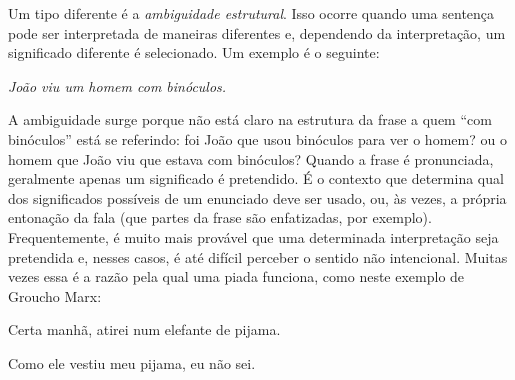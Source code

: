 Um tipo diferente é a \emph{ambiguidade estrutural}. Isso ocorre quando uma sentença pode ser interpretada de maneiras diferentes e, dependendo da interpretação, um significado diferente é selecionado. Um exemplo é o seguinte:
\begin{earg}
\item[] \textit{João viu um homem com binóculos.}
\end {earg}
A ambiguidade surge porque não está claro na estrutura da frase a quem ``com binóculos'' está se referindo: foi João que usou binóculos para ver o homem? ou o homem que João viu que estava com binóculos?
Quando a frase é pronunciada, geralmente apenas um significado é pretendido. É o contexto que determina qual dos significados possíveis de um enunciado deve ser usado, ou, às vezes, a própria entonação da fala (que partes da frase são enfatizadas, por exemplo). Frequentemente, é muito mais provável que uma determinada interpretação seja pretendida e, nesses casos, é até difícil perceber o sentido não intencional. Muitas vezes essa é a razão pela qual uma piada funciona, como neste exemplo de Groucho Marx:
\begin{earg}
\item[] Certa manhã, atirei num elefante de pijama.
\item[] Como ele vestiu meu pijama, eu não sei.
\end{earg} 

